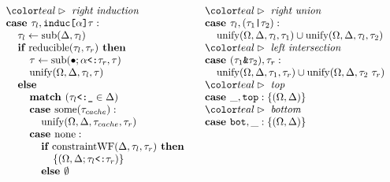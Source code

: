 \documentclass[acmsmall]{acmart}
\begin{document}
\begin{figure*}[h]
\[\begin{array}[t]{@{} l}
    \I \C{right induction}
    \\
    \I \B{case } \tau_l, \code{induc[$\alpha$]$\tau$} :
    \\
    \I\I \tau_l \leftarrow \F{sub}(\Delta, \tau_l)
    \\
    \I\I \B{if } \F{reducible}(\tau_l, \tau_r) \B{ then }
    \\
    \I\I\I \tau \leftarrow \F{sub}(\bullet;\code{$\alpha$<:$\tau_r$}, \tau) 
    \\
    \I\I\I \F{unify}(\Omega, \Delta, \tau_l, \tau)
    \\
    \I\I \B{else }
    \\
    \I\I\I \B{match } (\code{$\tau_l$<:\_} \in \Delta)
    \\
    \I\I\I \B{case } \F{some}(\tau_{cache}) :
    \\
    \I\I\I\I \F{unify}(\Omega, \Delta, \tau_{cache}, \tau_r)
    \\
    \I\I\I \B{case } \F{none} :
    \\
    \I\I\I\I \B{if } \F{constraintWF}(\Delta, \tau_l, \tau_r) \B{ then }
    \\
    \I\I\I\I\I \{(\Omega, \Delta;\code{$\tau_l$<:$\tau_r$})\}
    \\
    \I\I\I\I \B{else } \emptyset 
\end{array}
\begin{array}[t]{@{} l}
    \I \C{right union}
    \\
    \I \B{case } \tau_l, (\code{$\tau_1$|$\tau_2$}) : 
    \\
    \I\I \F{unify}(\Omega, \Delta, \tau_l, \tau_1) \cup \F{unify}(\Omega, \Delta, \tau_l, \tau_2) 

    \\

    \I \C{left intersection}
    \\
    \I \B{case } (\code{$\tau_1$\&$\tau_2$}), \tau_r : 
    \\
    \I\I \F{unify}(\Omega, \Delta, \tau_1, \tau_r) \cup \F{unify}(\Omega, \Delta, \tau_2\ \tau_r) 

    \\

    \I \C{top}
    \\
    \I \B{case } \_, \code{top} : \{(\Omega, \Delta)\}

    \\

    \I \C{bottom}
    \\
    \I \B{case } \code{bot}, \_ : \{(\Omega, \Delta)\}


\end{array}\]
\end{figure*}
\end{document}
